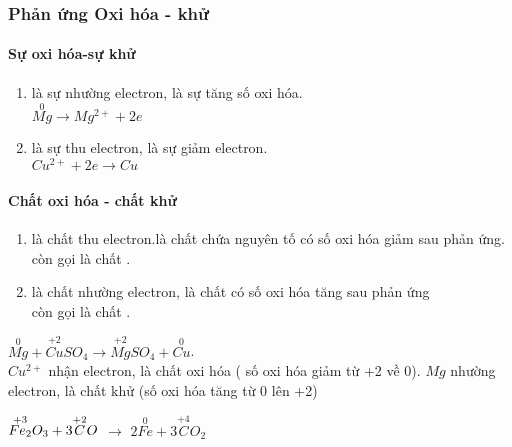 \begin{body}
	\subsubsection{Phản ứng Oxi hóa - khử}
	\begin{mylt}
		\paragraph{Sự oxi hóa-sự khử}
		\begin{enumerate}[label = \indam{\alph*)}]
			\item {} là sự nhường electron, là sự tăng số oxi hóa.\\
			 $\overset{0}{Mg} \rightarrow Mg^{2+} + 2e$
			\item {} là sự thu electron, là sự giảm electron.\\
			 $Cu^{2+} +2e \rightarrow Cu $
		\end{enumerate}
	\end{mylt}
	\begin{mylt}
		\paragraph{Chất oxi hóa - chất khử}
		\begin{enumerate}[label = \indam{\alph*)}]
			\item {} là chất thu electron.là chất chứa nguyên tố có số oxi hóa giảm sau phản ứng.\\
			 còn gọi là chất \indam{bị khử}.
			\item {} là chất nhường electron, là chất có số oxi hóa tăng sau phản ứng\\
			 còn gọi là chất \indam{bị oxi hóa}.
		\end{enumerate}
	\end{mylt}
	\begin{vdnote}
		$ \overset{0}{Mg} + \overset{+2}{Cu}SO_{4} \rightarrow\overset{+2}{Mg}SO_{4}  + \overset{0}{Cu}$.\\
		$Cu^{2+}$ nhận electron, là chất oxi hóa ( số oxi hóa giảm từ +2 về 0).
		$Mg$ nhường electron, là chất khử (số oxi hóa tăng từ 0 lên +2)
	\end{vdnote}
	\begin{vdnote}
		$\overset{+3}{Fe_2}\overset{\vphantom{+3}}{O_3} + 3\overset{+2}{C}O$ $\longrightarrow$ $ 2 \overset{0}{Fe} + 3\overset{+4}{C}O_2$
	\end{vdnote}
	\begin{mylt}

\end{mylt}
\end{body}
